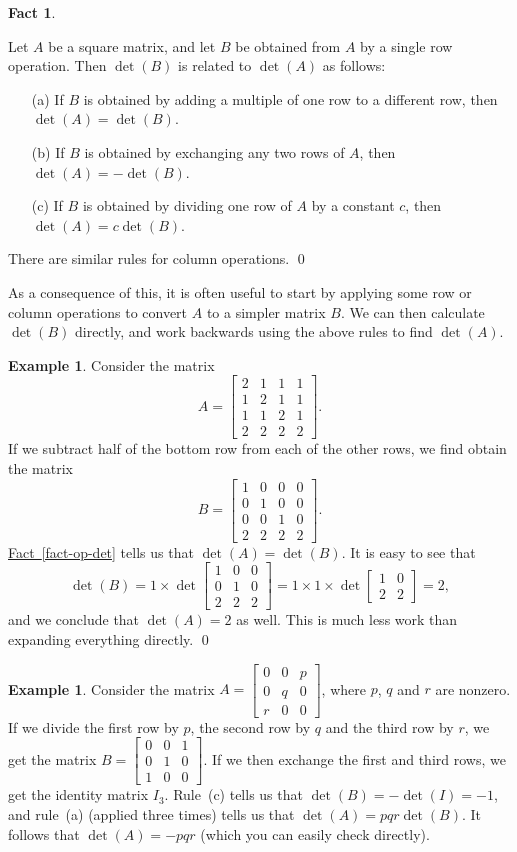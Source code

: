 \documentclass[a4paper]{book}
\newcommand{\bbm}       {\begin{bmatrix}}
\newcommand{\ebm}       {\end{bmatrix}}
\newcommand{\tm}        {\times}
\renewcommand{\:}{\colon}
\newcommand{\bilabel}[1]{\hypertarget{#1}{\label{#1}}}
\newcommand{\biref}[2]{\hyperlink{#2}{#1~\ref*{#2}}}
\theoremstyle{definition}
\newtheorem{fact}[theorem]{Fact}
\newtheorem{example}[theorem]{Example}
\begin{document}
\begin{fact}\bilabel{fact-op-det}
 Let $A$ be a square matrix, and let $B$ be obtained from $A$ by a
 single row operation.  Then $\det(B)$ is related to $\det(A)$ as
 follows: 
 \begin{itemize}
  \item[(a)] If $B$ is obtained by adding a multiple of one row to a
   different row, then $\det(A)=\det(B)$.
  \item[(b)] If $B$ is obtained by exchanging any two rows of $A$, then
   $\det(A)=-\det(B)$.
  \item[(c)] If $B$ is obtained by dividing one row of $A$ by a
   constant $c$, then $\det(A)=c\det(B)$.
 \end{itemize}
 There are similar rules for column operations. \qed
\end{fact}
As a consequence of this, it is often useful to start by applying some
row or column operations to convert $A$ to a simpler matrix $B$.  We
can then calculate $\det(B)$ directly, and work backwards using the
above rules to find $\det(A)$.
\begin{example}
 Consider the matrix 
 {\small \[ A=\bbm 2&1&1&1 \\ 1&2&1&1 \\ 1&1&2&1 \\  2&2&2&2 \ebm.\]} 
 If we subtract half of the bottom row from each of the other rows,
 we find obtain the matrix
 {\small \[ B=\bbm 1&0&0&0 \\ 0&1&0&0 \\ 0&0&1&0 \\  2&2&2&2 \ebm.\]}
 \biref{Fact}{fact-op-det} tells us that $\det(A)=\det(B)$.
 It is easy to see that
 \[ \det(B) = 1\tm \det\bbm 1&0&0\\0&1&0\\2&2&2 \ebm 
            = 1\tm 1\tm \det\bbm 1&0\\2&2 \ebm = 2,
 \]
 and we conclude that $\det(A)=2$ as well.  This is much less work
 than expanding everything directly.
 \qed
\end{example}
\begin{example}
 Consider the matrix $A=\bbm 0&0&p\\ 0&q&0\\ r&0&0\ebm$, where $p$,
 $q$ and $r$ are nonzero.  If we divide the first row by $p$, the
 second row by $q$ and the third row by $r$, we get the matrix
 $B=\bbm 0&0&1\\ 0&1&0\\ 1&0&0\ebm$.  If we then exchange the first and
 third rows, we get the identity matrix $I_3$.  Rule~(c) tells us that
 $\det(B)=-\det(I)=-1$, and rule~(a) (applied three times) tells us
 that $\det(A)=pqr\det(B)$.  It follows that $\det(A)=-pqr$ (which you
 can easily check directly).
\end{example}
\end{document}
